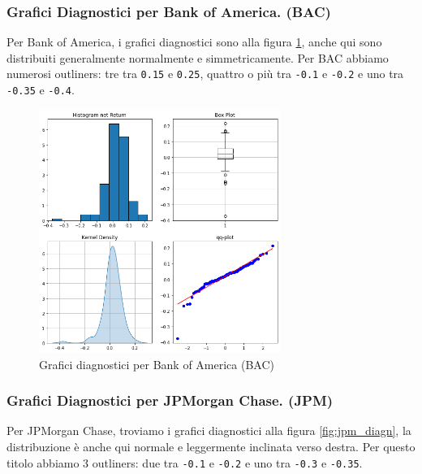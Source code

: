 \documentclass{article}
\begin{document}
\pagebreak

\subsubsection{Grafici Diagnostici per Bank of America. (BAC)}

Per Bank of America, i grafici diagnostici sono alla figura \ref{fig:bac_diagn}, anche qui sono distribuiti generalmente normalmente e simmetricamente.
Per BAC abbiamo numerosi outliners: tre tra \verb|0.15| e \verb|0.25|, quattro o più tra \verb|-0.1| e \verb|-0.2| e uno tra \verb|-0.35| e \verb|-0.4|.

\vspace{3cm}

\begin{figure}[h]
  \centering
  \includegraphics[width=0.7\textwidth]{bac_diagn.png}
  \caption{Grafici diagnostici per Bank of America (BAC)}
  \label{fig:bac_diagn}
\end{figure}

\pagebreak

\subsubsection{Grafici Diagnostici per JPMorgan Chase. (JPM)}

Per JPMorgan Chase, troviamo i grafici diagnostici alla figura \ref{fig:jpm_diagn}, la distribuzione è anche qui normale e leggermente inclinata verso destra.
Per questo titolo abbiamo 3 outliners: due tra \verb|-0.1| e \verb|-0.2| e uno tra \verb|-0.3| e \verb|-0.35|.

\vspace{3cm}
\end{document}
